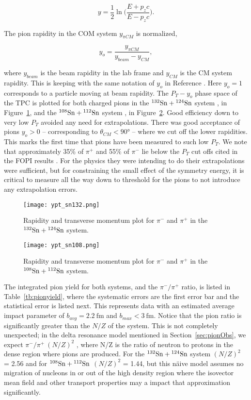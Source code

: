 \begin{equation}
y = \frac{1}{2} \ln\Big( \frac{E + p_zc}{E - p_zc}\Big).
\end{equation}

The pion rapidity in the COM system $y_{\pi CM}$ is normalized,

\begin{equation}
y_o = \frac{y_{\pi CM}}{y_{beam} - y_{CM}},
\end{equation}

where $y_{beam}$ is the beam rapidity in the lab frame and $y_{CM}$ is the CM system rapidity. This is keeping with the same notation of $y_o$ in Reference \cite{fopi}. Here $y_o = 1$ corresponds to a particle moving at beam rapidity. The   $P_T - y_o$ phase space of the \spirit TPC is plotted for both charged pions in the ${}^{132}\mathrm{Sn} + {}^{124}\mathrm{Sn}$ system , in Figure~\ref{fig:ptrap_sn132}, and the ${}^{108}\mathrm{Sn} + {}^{112}\mathrm{Sn}$ system , in Figure~\ref{fig:ptrap_sn108}. Good efficiency down to very low $P_T$ avoided any need for extrapolations. There was good acceptance of pions $y_o > 0$ -- corresponding to $\theta_{CM} < \ang{90}$ -- where we cut off the lower rapidities. This marks the first time that pions have been measured to such low $P_T$. We note that approximately 35\% of $\pi^+$ and 55\% of $\pi^-$ lie below the $P_T$ cut offs cited in the FOPI results \cite{fopi}. For the physics they were intending to do their extrapolations were sufficient, but for constraining the small effect of the symmetry energy, it is critical to measure all the way down to threshold for the pions to not introduce any extrapolation errors.

\begin{figure}[!htb]
\centering
\texttt{[image: ypt\_sn132.png]}
\caption{Rapidity and transverse momentum plot for $\pi^-$ and $\pi^+$ in the ${}^{132}\mathrm{Sn} + {}^{124}\mathrm{Sn}$ system.}
\label{fig:ptrap_sn132}
\end{figure}


\begin{figure}[!htb]
\centering
\texttt{[image: ypt\_sn108.png]}
\caption{Rapidity and transverse momentum plot for $\pi^-$ and $\pi^+$ in the ${}^{108}\mathrm{Sn} + {}^{112}\mathrm{Sn}$ system.}
\label{fig:ptrap_sn108}
\end{figure}

The integrated pion yield for both systems, and the $\pi^-/\pi^+$ ratio, is listed in Table~\ref{tb:pionyield}, where the systematic errors are the first error bar and the statistical error is listed next. This represents data with an estimated average impact parameter of $b_{avg} = \SI{2.2}{\femto\metre}$ and $b_{max} < \SI{3}{\femto\metre}$. Notice that the pion ratio is significantly greater than the $N/Z$ of the system.  This is not completely unexpected; in the delta resonance model mentioned in Section~\ref{sec:pionObs}, we expect  $\pi^-/\pi^+ ~ (N/Z)^2$ \cite{baoan_piprod1,baoan_piprod2}, where N/Z is the ratio of neutron to protons in the dense region where pions are produced. For the ${}^{132}\mathrm{Sn} + {}^{124}\mathrm{Sn}$ system $(N/Z)^2$ = 2.56 and for ${}^{108}\mathrm{Sn} + {}^{112}\mathrm{Sn}$ $(N/Z)^2$ = 1.44, but this n\"aive model assumes no migration of nucleons in or out of the high density region where the isovector mean field and other transport properties may a impact that approximation significantly. 

